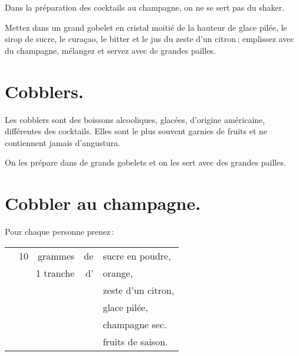 Dans la préparation des cocktails au champagne, on ne se sert pas du shaker.

Mettez dans un grand gobelet en cristal moitié de la hauteur de glace pilée, le
sirop de sucre, le curaçao, le bitter et le jus du zeste d'un citron ;
emplissez avec du champagne, mélangez et servez avec de grandes pailles.

\section*{\centering Cobblers.}
{}

Les cobblers sont des boissons alcooliques, glacées, d'origine américaine,
différentes des cocktails. Elles sont le plus souvent garnies de fruits et ne
contiennent jamais d'angustura.

On les prépare dans de grands gobelets et on les sert avec des grandes pailles.

\section*{\centering Cobbler au champagne.}
{}

Pour chaque personne prenez :

\footnotesize
\begin{longtable}{rrrrp{16em}}
  & 10 & grammes & de & sucre en poudre,                                                                  \\
  & \multicolumn{2}{r}{1 tranche} & d' & orange,                                                          \\
  &    &         &    & zeste d'un citron,                                                                \\
  &    &         &    & glace pilée,                                                                      \\
  &    &         &    & champagne sec.                                                                    \\
  &    &         &    & fruits de saison.                                                                 \\
\end{longtable}
\normalsize

